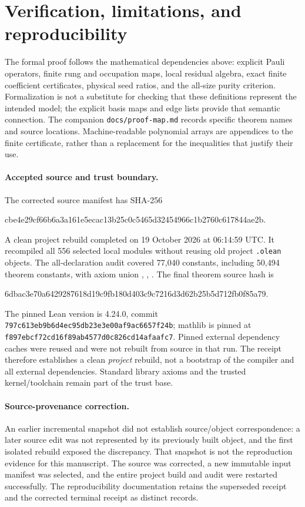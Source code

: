 \section{Verification, limitations, and reproducibility}\label{sec:verification}
The formal proof follows the mathematical dependencies above: explicit Pauli
operators, finite rung and occupation maps, local residual algebra, exact
finite coefficient certificates, physical seed ratios, and the all-size purity
criterion. Formalization is not a substitute for checking that these definitions
represent the intended model; the explicit basis maps and edge lists provide
that semantic connection. The companion \nolinkurl{docs/proof-map.md} records
specific theorem names and source locations. Machine-readable polynomial
arrays are appendices to the finite certificate, rather than a replacement
for the inequalities that justify their use.

\paragraph{Accepted source and trust boundary.}
The corrected source manifest has SHA-256
\begin{center}\small\ttfamily
cbe4e29cf66b6a3a161e5ecac13b25c0c5465d32454966c1b2760c617844ae2b.
\end{center}
A clean project rebuild completed on 19 October 2026 at 06:14:59 UTC. It
recompiled all 556 selected local modules without reusing old project
\texttt{.olean} objects. The all-declaration audit covered 77,040 constants,
including 50,494 theorem constants, with axiom union
, , .
The final theorem source hash is
\begin{center}\small\ttfamily
6dbac3e70a6429287618d19c9fb180d403c9c7216d3d62b25b5d712fb0f85a79.
\end{center}
The pinned Lean version is 4.24.0, commit
\texttt{797c613eb9b6d4ec95db23e3e00af9ac6657f24b}; mathlib is pinned at
\texttt{f897ebcf72cd16f89ab4577d0c826cd14afaafc7}.
Pinned external dependency caches were reused and were not rebuilt from source
in that run. The receipt therefore establishes a clean \emph{project} rebuild,
not a bootstrap of the compiler and all external dependencies. Standard
library axioms and the trusted kernel/toolchain remain part of the trust base.

\paragraph{Source-provenance correction.}
An earlier incremental snapshot did not establish source/object correspondence:
a later source edit was not represented by its previously built object, and the
first isolated rebuild exposed the discrepancy. That snapshot is not the
reproduction evidence for this manuscript. The source was corrected, a new
immutable input manifest was selected, and the entire project build and audit
were restarted successfully. The reproducibility documentation retains the
superseded receipt and the corrected terminal receipt as distinct records.

